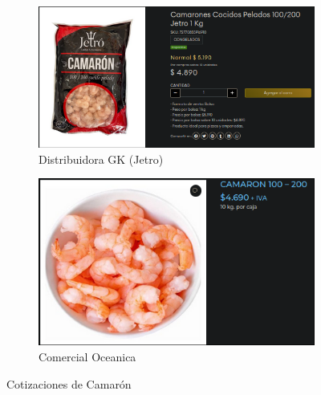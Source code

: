 \documentclass[12pt]{article}
\begin{document}
    \begin{figure}[H]
        \centering
        \begin{subfigure}{0.48\textwidth}
            \centering
            \includegraphics[width=\linewidth]{gk} %
            \caption{Distribuidora GK (Jetro)}
            \label{fig:distribuidora_gk}
        \end{subfigure}
        \hfill
        \begin{subfigure}{0.48\textwidth}
            \centering
            \includegraphics[width=\linewidth]{oceanic}
            \caption{Comercial Oceanica}
            \label{fig:comercial_oceanica}
        \end{subfigure}
        \caption{Cotizaciones de Camarón}
        \label{fig:cotizaciones_camaron}
    \end{figure}
\newpage
\end{document}
